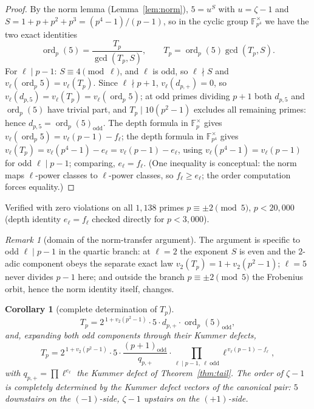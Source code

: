 \documentclass[11pt]{amsart}
\newtheorem{corollary}[theorem]{Corollary}
\theoremstyle{definition}
\theoremstyle{remark}
\newtheorem{remark}[theorem]{Remark}
\newcommand{\F}{\mathbb{F}}
\newcommand{\ord}{\operatorname{ord}}
\begin{document}
\begin{proof}
By the norm lemma (Lemma~\ref{lem:norm}), $5 = u^{S}$ with $u = \zeta - 1$
and $S = 1 + p + p^2 + p^3 = (p^4-1)/(p-1)$, so in the cyclic group
$\F_{p^4}^\times$ we have the two exact identities
\[
\ord_p(5)=\frac{T_p}{\gcd(T_p,S)},\qquad
T_p=\ord_p(5)\gcd(T_p,S).
\]
For
$\ell \mid p-1$: $S \equiv 4 \pmod \ell$, and $\ell$ is odd, so
$\ell \nmid S$ and $v_\ell(\ord_p 5) = v_\ell(T_p)$. Since
$\ell \nmid p+1$, $v_\ell(d_{p,+}) = 0$, so
$v_\ell(d_{p,5}) = v_\ell(T_p) = v_\ell(\ord_p 5)$; at odd primes dividing
$p + 1$ both $d_{p,5}$ and $\ord_p(5)$ have trivial part, and
$T_p \mid 10(p^2-1)$ excludes all remaining primes: hence
$d_{p,5} = \ord_p(5)_{\mathrm{odd}}$. The depth formula in $\F_p^\times$
gives $v_\ell(\ord_p 5) = v_\ell(p-1) - f_\ell$; the depth formula in
$\F_{p^4}^\times$ gives $v_\ell(T_p) = v_\ell(p^4-1) - e_\ell =
v_\ell(p-1) - e_\ell$, using $v_\ell(p^4-1) = v_\ell(p-1)$ for odd
$\ell \mid p-1$; comparing, $e_\ell = f_\ell$. (One inequality is
conceptual: the norm maps $\ell$-power classes to $\ell$-power classes, so
$f_\ell \ge e_\ell$; the order computation forces equality.)
\end{proof}

Verified with zero violations on all $1{,}138$ primes
$p \equiv \pm2 \pmod 5$, $p < 20{,}000$ (depth identity $e_\ell = f_\ell$
checked directly for $p < 3{,}000$).

\begin{remark}[domain of the norm-transfer argument]
The argument is specific to odd $\ell \mid p-1$ in the quartic branch: at
$\ell = 2$ the exponent $S$ is even and the $2$-adic component obeys the
separate exact law $v_2(T_p) = 1 + v_2(p^2-1)$; $\ell = 5$ never divides
$p - 1$ here; and outside the branch $p \equiv \pm2 \pmod 5$ the Frobenius
orbit, hence the norm identity itself, changes.
\end{remark}

\begin{corollary}[complete determination of $T_p$]\label{cor:Tdetermined}
\[
T_p
= 2^{\,1 + v_2(p^2-1)} \cdot 5 \cdot d_{p,+} \cdot
\ord_p(5)_{\mathrm{odd}},
\]
and, expanding both odd components through their Kummer defects,
\[
T_p
= 2^{\,1 + v_2(p^2-1)} \cdot 5 \cdot
\frac{(p+1)_{\mathrm{odd}}}{q_{p,+}} \cdot
\prod_{\ell \mid p-1,\ \ell\ \mathrm{odd}} \ell^{\,v_\ell(p-1) - f_\ell},
\]
with $q_{p,+} = \prod \ell^{e_\ell}$ the Kummer defect of
Theorem~\ref{thm:tail}. The order of $\zeta - 1$ is completely determined
by the Kummer defect vectors of the canonical pair: $5$ downstairs on the
$(-1)$-side, $\zeta - 1$ upstairs on the $(+1)$-side.
\end{corollary}
\end{document}
